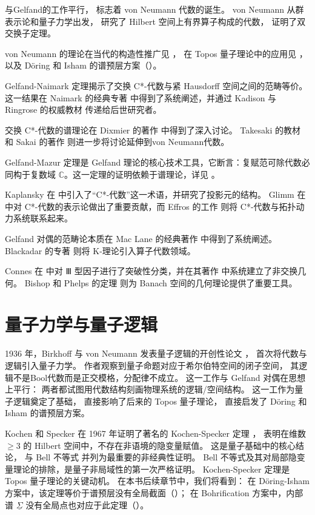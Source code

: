 \documentclass[10pt, openany]{book}
\begin{document}
与Gelfand的工作平行，
\cite{vonNeumann1936}标志着 von Neumann 代数的诞生。
 von Neumann 从群表示论和量子力学出发，
研究了 Hilbert 空间上有界算子构成的代数，
证明了双交换子定理。

von Neumann 的理论在当代的构造性推广见 \cite{BanaschewskiMulvey2006}，
在 Topos 量子理论中的应用见 \cite{HeunenLandsmanSpitters2009}，
以及 Döring 和 Isham 的谱预层方案（\cite{DoeringIsham2008a,DoeringIsham2008b,DoeringIsham2010}）。

Gelfand-Naimark 定理揭示了交换 C*-代数与紧 Hausdorff 空间之间的范畴等价。
这一结果在 Naimark 的经典专著 \cite{Naimark1956} 中得到了系统阐述，并通过 Kadison 与 Ringrose 的权威教材 \cite{KadisonRingrose1983,KadisonRingrose1986} 传递给后世研究者。

交换 C*-代数的谱理论在 Dixmier 的著作 \cite{Dixmier1957} 中得到了深入讨论。
Takesaki 的教材 \cite{Takesaki1979} 和 Sakai 的著作 \cite{Sakai1971} 则进一步将讨论延伸到von Neumann代数。

Gelfand-Mazur 定理是 Gelfand 理论的核心技术工具，它断言：复赋范可除代数必同构于复数域 \(\mathbb{C}\)。这一定理的证明依赖于谱理论，详见 \cite{GelfandMazur1938}。

Kaplansky 在 \cite{Kaplansky1951} 中引入了“C*-代数”这一术语，并研究了投影元的结构。
Glimm 在 \cite{Glimm1960} 中对 C*-代数的表示论做出了重要贡献，而 Effros 的工作 \cite{Effros1965} 则将 C*-代数与拓扑动力系统联系起来。

Gelfand 对偶的范畴论本质在 Mac Lane 的经典著作 \cite{MacLane1971} 中得到了系统阐述。
Blackadar 的专著 \cite{Blackadar1986} 则将 K-理论引入算子代数领域。

Connes 在 \cite{Connes1973} 中对 Ⅲ 型因子进行了突破性分类，并在其著作 \cite{Connes1994} 中系统建立了非交换几何。
Bishop 和 Phelps 的定理 \cite{BishopPhelps1962} 则为 Banach 空间的几何理论提供了重要工具。

\section{量子力学与量子逻辑}

1936 年，Birkhoff 与 von Neumann 发表量子逻辑的开创性论文 \cite{BirkhoffvonNeumann1936}，
首次将代数与逻辑引入量子力学。
作者观察到量子命题对应于希尔伯特空间的闭子空间，
其逻辑不是Bool代数而是正交模格，分配律不成立。
这一工作与 Gelfand 对偶在思想上平行：
两者都试图用代数结构刻画物理系统的逻辑/空间结构。
这一工作为量子逻辑奠定了基础，
直接影响了后来的 Topos 量子理论，
直接启发了 Döring 和 Isham 的谱预层方案。

Kochen 和 Specker 在 1967 年证明了著名的 Kochen-Specker 定理 \cite{KochenSpecker1967}，
表明在维数 \(\ge 3\) 的 Hilbert 空间中，不存在非语境的隐变量赋值。
这是量子基础中的核心结论，
与 Bell 不等式 \cite{Bell1964} 并列为最重要的非经典性证明。
Bell 不等式及其对局部隐变量理论的排除，是量子非局域性的第一次严格证明。
Kochen-Specker 定理是 Topos 量子理论的关键动机。
在本书后续章节中，我们将看到：
在 Döring-Isham 方案中，该定理等价于谱预层没有全局截面（\cite{DoeringIsham2008a}）；
在 Bohrification 方案中，内部谱 \(\underline{\Sigma}\) 没有全局点也对应于此定理（\cite{HeunenLandsmanSpitters2009}）。
\end{document}
